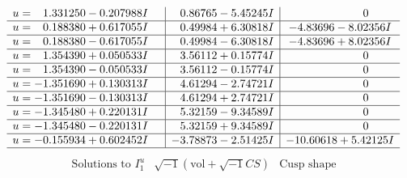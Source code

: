 \documentclass[1p]{elsarticle_modified}
\theoremstyle{definition}
\newcommand{\I}{\sqrt{-1}}
\begin{document}
$$\begin{array}{c|c|c}
\begin{aligned}
u &= \phantom{-}1.331250 - 0.207988 I\end{aligned}
 & \phantom{-}0.86765 - 5.45245 I & \phantom{-0.000000 } 0 \\ \hline\begin{aligned}
u &= \phantom{-}0.188380 + 0.617055 I\end{aligned}
 & \phantom{-}0.49984 + 6.30818 I & -4.83696 - 8.02356 I \\ \hline\begin{aligned}
u &= \phantom{-}0.188380 - 0.617055 I\end{aligned}
 & \phantom{-}0.49984 - 6.30818 I & -4.83696 + 8.02356 I \\ \hline\begin{aligned}
u &= \phantom{-}1.354390 + 0.050533 I\end{aligned}
 & \phantom{-}3.56112 + 0.15774 I & \phantom{-0.000000 } 0 \\ \hline\begin{aligned}
u &= \phantom{-}1.354390 - 0.050533 I\end{aligned}
 & \phantom{-}3.56112 - 0.15774 I & \phantom{-0.000000 } 0 \\ \hline\begin{aligned}
u &= -1.351690 + 0.130313 I\end{aligned}
 & \phantom{-}4.61294 - 2.74721 I & \phantom{-0.000000 } 0 \\ \hline\begin{aligned}
u &= -1.351690 - 0.130313 I\end{aligned}
 & \phantom{-}4.61294 + 2.74721 I & \phantom{-0.000000 } 0 \\ \hline\begin{aligned}
u &= -1.345480 + 0.220131 I\end{aligned}
 & \phantom{-}5.32159 - 9.34589 I & \phantom{-0.000000 } 0 \\ \hline\begin{aligned}
u &= -1.345480 - 0.220131 I\end{aligned}
 & \phantom{-}5.32159 + 9.34589 I & \phantom{-0.000000 } 0 \\ \hline\begin{aligned}
u &= -0.155934 + 0.602452 I\end{aligned}
 & -3.78873 - 2.51425 I & -10.60618 + 5.42125 I\\
 \hline 
 \end{array}$$\newpage$$\begin{array}{c|c|c}  
\text{Solutions to }I^u_{1}& \I (\text{vol} + \sqrt{-1}CS) & \text{Cusp shape}\\

\end{array}$$
\end{document}
